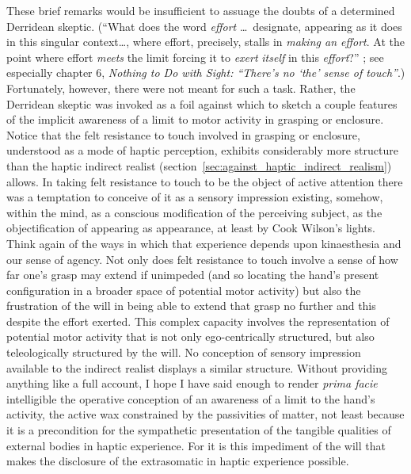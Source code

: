 These brief remarks would be insufficient to assuage the doubts of a determined Derridean skeptic. (``What does the word \emph{effort} \ldots\ designate, appearing as it does in this singular context\ldots, where effort, precisely, stalls in \emph{making an effort}. At the point where effort \emph{meets} the limit forcing it to \emph{exert} \emph{itself} in this \emph{effort}?'' \citealt[110]{Derrida:2005aa}; see especially chapter 6, \emph{Nothing to Do with Sight: ``There's no `the' sense of touch''}.) Fortunately, however, there were not meant for such a task. Rather, the Derridean skeptic was invoked as a foil against which to sketch a couple features of the implicit awareness of a limit to motor activity in grasping or enclosure. Notice that the felt resistance to touch involved in grasping or enclosure, understood as a mode of haptic perception, exhibits considerably more structure than the haptic indirect realist (section~\ref{sec:against_haptic_indirect_realism}) allows. In taking felt resistance to touch to be the object of active attention there was a temptation to conceive of it as a sensory impression existing, somehow, within the mind, as a conscious modification of the perceiving subject, as the objectification of appearing as appearance, at least by Cook Wilson's lights. Think again of the ways in which that experience depends upon kinaesthesia and our sense of agency. Not only does felt resistance to touch involve a sense of how far one's grasp may extend if unimpeded (and so locating the hand's present configuration in a broader space of potential motor activity) but also the frustration of the will in being able to extend that grasp no further and this despite the effort exerted. This complex capacity involves the representation of potential motor activity that is not only ego-centrically structured, but also teleologically structured by the will. No conception of sensory impression available to the indirect realist displays a similar structure. Without providing anything like a full account, I hope I have said enough to render \emph{prima facie} intelligible the operative conception of an awareness of a limit to the hand's activity, the active wax constrained by the passivities of matter, not least because it is a precondition for the sympathetic presentation of the tangible qualities of external bodies in haptic experience. For it is this impediment of the will that makes the disclosure of the extrasomatic in haptic experience possible.



